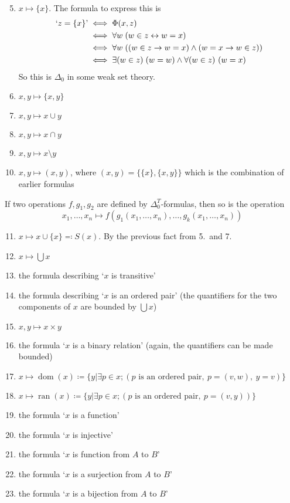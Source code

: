 \documentclass{article}
\DeclareMathOperator{\dom}{dom}
\DeclareMathOperator{\ran}{ran}
\begin{document}
\begin{enumerate}
  \setcounter{enumi}{4}
  \item $x \mapsto \{x\}$. The formula to express this is
    \begin{align*}
      `z = \{x\}\text{'} &\iff \Phi(x,z) \\
                  &\iff \forall w \; (w \in z \leftrightarrow w = x) \\
                  &\iff \forall w \; ((w \in z \rightarrow w = x) \land (w = x \rightarrow w \in z)) \\
                  &\iff \exists (w \in z) \; (w = w) \land \forall (w \in z) \ (w = x)
    \end{align*}
    So this is $\Delta_0$ in some weak set theory.
  \item $x,y \mapsto \{x,y\}$
  \item $x,y \mapsto x \cup y$
  \item $x,y \mapsto x \cap y$
  \item $x,y \mapsto x \setminus y$
  \item $x,y \mapsto (x,y)$, where $(x,y) = \{\{x\},\{x,y\}\}$ which is the combination of earlier formulas
\end{enumerate}
If two operations $f, g_1, g_2$ are defined by $\Delta_0^T$-formulas, then so is the operation
\begin{equation*}
  x_1, \dotsc, x_n \mapsto f(g_1(x_1, \dotsc, x_n), \dotsc, g_k(x_1, \dotsc, x_n))
\end{equation*}
\begin{enumerate}
  \setcounter{enumi}{10}
  \item $x \mapsto x \cup \{x\} \eqqcolon S(x)$.
    By the previous fact from 5.\ and 7.
  \item $x \mapsto \bigcup x$
  \item the formula describing `$x$ is transitive'
  \item the formula describing `$x$ is an ordered pair' (the quantifiers for the two components of $x$ are bounded by $\bigcup x$)
  \item $x,y \mapsto x \times y$
  \item the formula `$x$ is a binary relation' (again, the quantifiers can be made bounded)
  \item $x \mapsto \dom(x) \coloneqq \{y | \exists p \in x; (p\text{ is an ordered pair},\ p = (v,w),\ y=v)\}$
  \item $x \mapsto \ran(x) \coloneqq \{y | \exists p \in x; (p\text{ is an ordered pair},\ p = (v,y))\}$
  \item the formula `$x$ is a function'
  \item the formula `$x$ is injective'
  \item the formula `$x$ is function from $A$ to $B$'
  \item the formula `$x$ is a surjection from $A$ to $B$'
  \item the formula `$x$ is a bijection from $A$ to $B$'
\end{enumerate}
\end{document}
